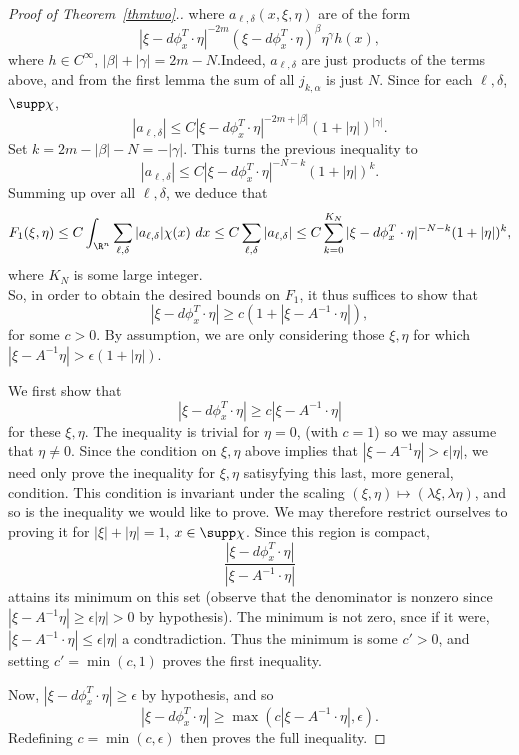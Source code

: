 \documentclass[12pt]{article}
\begin{document}
\begin{proof}[Proof of Theorem~\ref{thmtwo}.]
where $a_{\ell,\delta}(x,\xi,\eta)$ are of the form
\[|\xi-d\phi_x^T\cdot \eta|^{-2m}(\xi-d\phi_x^T\cdot\eta)^{\beta}\eta^{\gamma}h(x),\]
where $h \in C^\infty$, $|\beta|+|\gamma| = 2m-N$.Indeed, $a_{\ell,\delta}$ are just products of the terms above, and from the first lemma the sum of all $j_{k,\alpha}$ is just $N$.
Since for each $\ell,\delta$, $\supp \chi$,
\[|a_{\ell,\delta}| \leq C|\xi-d\phi_x^T\cdot \eta|^{-2m+|\beta|}(1+|\eta|)^{|\gamma|}.\]
Set $k = 2m-|\beta|-N = -|\gamma|$. This turns the previous inequality to
\[|a_{\ell,\delta}| \leq C|\xi-d\phi_x^T\cdot \eta|^{-N-k}(1+|\eta|)^{k}.\] Summing up over all $\ell,\delta$, we deduce that
\[F_1(\xi,\eta) \leq C\int_{\R^n}\sum_{\ell,\delta} |a_{\ell,\delta}|\chi(x)\ dx \leq C\sum_{\ell,\delta} |a_{\ell,\delta}| \leq C\sum_{k=0}^{K_N} |\xi-d\phi_x^T\cdot \eta|^{-N-k}(1+|\eta|)^{k},\]
where $K_N$ is some large integer.\\


So, in order to obtain the desired bounds on $F_1$, it thus suffices to show that
\[|\xi-d\phi_x^T\cdot \eta| \geq c(1+|\xi-A^{-1}\cdot \eta|),\]
for some $c > 0$. By assumption, we are only considering those $\xi,\eta$ for which $|\xi-A^{-1}\eta| > \epsilon(1+|\eta|)$. 

We first show that 
\[|\xi-d\phi_x^T\cdot \eta| \geq c|\xi-A^{-1}\cdot \eta|\] for these $\xi,\eta$. The inequality is trivial for $\eta = 0$, (with $c=1$) so we may assume that $\eta \neq 0$. Since the condition on $\xi,\eta$ above implies that
$|\xi-A^{-1}\eta| > \epsilon|\eta|$, we need only prove the inequality for $\xi,\eta$ satisyfying this last, more general, condition. This condition is invariant under the scaling $(\xi,\eta) \mapsto (\lambda\xi,\lambda\eta)$, and so is the inequality we would like to prove. We may therefore restrict ourselves to proving it for $|\xi|+|\eta| = 1$, $x \in \supp \chi$.
Since this region is compact,
\[\frac{|\xi-d\phi_x^T\cdot \eta|}{|\xi-A^{-1}\cdot \eta|}\] attains its minimum on this set (observe that the denominator is nonzero since $|\xi-A^{-1}\eta| \geq \epsilon|\eta| > 0$ by hypothesis). The minimum is not zero, snce if it were, $|\xi-A^{-1}\cdot \eta| \leq \epsilon|\eta|$ a condtradiction. Thus the minimum is some $c' > 0$, and setting $c' = \min(c,1)$ proves the first inequality.

Now, $|\xi-d\phi_x^T\cdot \eta| \geq \epsilon$ by hypothesis, and so 
\[|\xi-d\phi_x^T\cdot \eta| \geq \max(c|\xi-A^{-1}\cdot \eta|, \epsilon).\] Redefining $c = \min(c,\epsilon)$ then proves the full inequality.
\end{proof}
\end{document}

